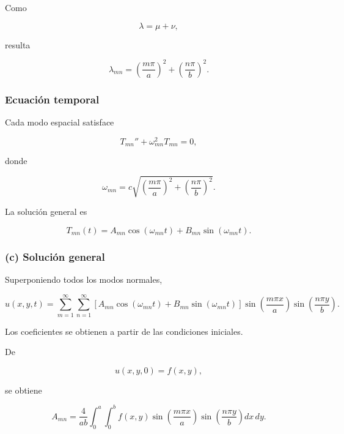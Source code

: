 \documentclass[11pt,spanish]{article}
\begin{document}
Como

\[
\lambda=\mu+\nu,
\]

resulta

\begin{equation}
\lambda_{mn}
=
\left(\frac{m\pi}{a}\right)^2
+
\left(\frac{n\pi}{b}\right)^2.
\end{equation}

\subsubsection*{Ecuación temporal}

Cada modo espacial satisface

\begin{equation}
T_{mn}''
+
\omega_{mn}^2T_{mn}=0,
\end{equation}

donde

\begin{equation}
\omega_{mn}
=
c
\sqrt{
\left(\frac{m\pi}{a}\right)^2
+
\left(\frac{n\pi}{b}\right)^2
}.
\end{equation}

La solución general es

\begin{equation}
T_{mn}(t)
=
A_{mn}\cos(\omega_{mn}t)
+
B_{mn}\sin(\omega_{mn}t).
\end{equation}

\subsubsection*{(c) Solución general}

Superponiendo todos los modos normales,

\begin{equation}
\boxed{
u(x,y,t)
=
\sum_{m=1}^{\infty}
\sum_{n=1}^{\infty}
\left[
A_{mn}\cos(\omega_{mn}t)
+
B_{mn}\sin(\omega_{mn}t)
\right]
\sin\!\left(\frac{m\pi x}{a}\right)
\sin\!\left(\frac{n\pi y}{b}\right).
}
\end{equation}

Los coeficientes se obtienen a partir de las condiciones iniciales.

De

\[
u(x,y,0)=f(x,y),
\]

se obtiene

\begin{equation}
A_{mn}
=
\frac{4}{ab}
\int_0^a
\int_0^b
f(x,y)
\sin\!\left(\frac{m\pi x}{a}\right)
\sin\!\left(\frac{n\pi y}{b}\right)
dx\,dy.
\end{equation}
\end{document}
